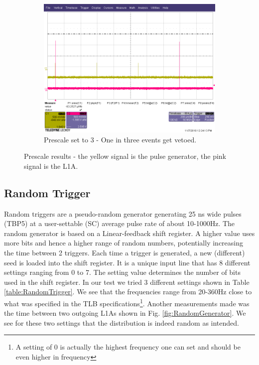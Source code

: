 \begin{figure}
    \begin{subfigure}[t]{.5\textwidth}
      \includegraphics[width=1.0\linewidth]{2kHzPrescale3.png}
      \caption{Prescale set to 3 - One in three events get vetoed.}
      \label{fig:2kHzPrescale3}
    \end{subfigure}
    \caption[Prescale results]{Prescale results - the yellow signal is the pulse generator, the pink signal is the L1A.}
    \label{fig:Prescales}
\end{figure}


\subsection{Random Trigger}
\label{Random Trigger}

Random triggers are a pseudo-random generator generating 25 ns wide pulses (TBP5) at a user-settable (SC) average pulse rate of about 10-1000Hz. The random generator is based on a Linear-feedback shift
register. A higher value uses more bits and hence a higher range of random numbers, potentially increasing the time between 2 triggers. Each time a trigger is generated, a new (different) seed is loaded into the shift register. It is a unique input line that has 8 different settings ranging from 0 to 7. The setting value determines the number of bits used in the shift register. In our test we tried 3 different settings shown in Table \ref{table:RandomTrigger}. We see that the frequencies range from 20-360Hz close to what was specified in the TLB specifications\footnote{A setting of 0 is actually the highest frequency one can set and should be even higher in frequency}. Another measurements made was the time between two outgoing L1As shown in Fig. \ref{fig:RandomGenerator}. We see for these two settings that the distribution is indeed random as intended.

